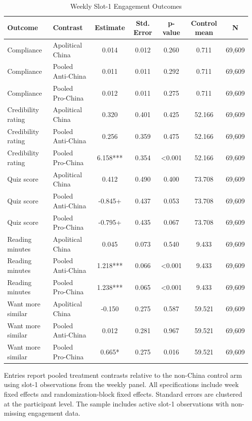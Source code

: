 \begin{table}[H]
\centering
\caption{Weekly Slot-1 Engagement Outcomes}
\label{tab:weekly_panel_slot1}
\footnotesize
\begin{threeparttable}
\begin{tabular}{llccccc}
\toprule
Outcome & Contrast & Estimate & Std. Error & p-value & Control mean & N \\
\midrule
Compliance & Apolitical China & 0.014 & 0.012 & 0.260 & 0.711 & 69,609 \\
Compliance & Pooled Anti-China & 0.011 & 0.011 & 0.292 & 0.711 & 69,609 \\
Compliance & Pooled Pro-China & 0.012 & 0.011 & 0.275 & 0.711 & 69,609 \\
Credibility rating & Apolitical China & 0.320 & 0.401 & 0.425 & 52.166 & 69,609 \\
Credibility rating & Pooled Anti-China & 0.256 & 0.359 & 0.475 & 52.166 & 69,609 \\
Credibility rating & Pooled Pro-China & 6.158*** & 0.354 & <0.001 & 52.166 & 69,609 \\
Quiz score & Apolitical China & 0.412 & 0.490 & 0.400 & 73.708 & 69,609 \\
Quiz score & Pooled Anti-China & -0.845+ & 0.437 & 0.053 & 73.708 & 69,609 \\
Quiz score & Pooled Pro-China & -0.795+ & 0.435 & 0.067 & 73.708 & 69,609 \\
Reading minutes & Apolitical China & 0.045 & 0.073 & 0.540 & 9.433 & 69,609 \\
Reading minutes & Pooled Anti-China & 1.218*** & 0.066 & <0.001 & 9.433 & 69,609 \\
Reading minutes & Pooled Pro-China & 1.238*** & 0.065 & <0.001 & 9.433 & 69,609 \\
Want more similar & Apolitical China & -0.150 & 0.275 & 0.587 & 59.521 & 69,609 \\
Want more similar & Pooled Anti-China & 0.012 & 0.281 & 0.967 & 59.521 & 69,609 \\
Want more similar & Pooled Pro-China & 0.665* & 0.275 & 0.016 & 59.521 & 69,609 \\
\bottomrule
\end{tabular}
\begin{tablenotes}[flushleft]
\footnotesize
\item Entries report pooled treatment contrasts relative to the non-China control arm using slot-1 observations from the weekly panel. All specifications include week fixed effects and randomization-block fixed effects. Standard errors are clustered at the participant level. The sample includes active slot-1 observations with non-missing engagement data.
\end{tablenotes}
\end{threeparttable}
\end{table}
